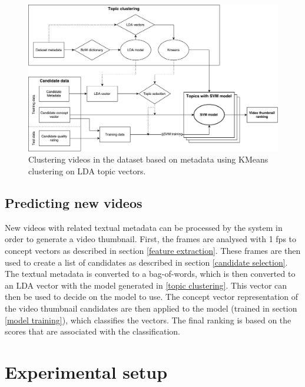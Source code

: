 \documentclass{../resources/sig-alternate-05-2015}
\begin{document}

\begin{figure}[ht]
  \label{topic clustering scheme}
  \includegraphics[width=\textwidth]{resources/topic-clustering}
  \caption{Clustering videos in the dataset based on metadata using KMeans clustering on LDA topic vectors.}
\end{figure}

\subsection{Predicting new videos}

New videos with related textual metadata can be processed by the system in order to generate a video thumbnail. First, the frames are analysed with 1 fps to concept vectors as described in section \ref{feature extraction}. These frames are then used to create a list of candidates as described in section \ref{candidate selection}. The textual metadata is converted to a bag-of-words, which is then converted to an LDA vector with the model generated in \ref{topic clustering}. This vector can then be used to decide on the model to use. The concept vector representation of the video thumbnail candidates are then applied to the model (trained in section \ref{model training}), which classifies the vectors. The final ranking is based on the scores that are associated with the classification.



\section{Experimental setup}
\label{experimental setup dataset}
\end{document}
